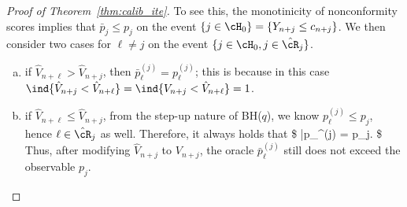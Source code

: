 \begin{proof}[Proof of Theorem~\ref{thm:calib_ite}]
To see this, the monotinicity of nonconformity scores
implies that $\bar{p}_j \leq   p_j$ on the event $\{j\in \cH_0\} =\{Y_{n+j} \leq c_{n+j}\}$.
We then consider two cases for $\ell\neq j$
on the event $\{j\in \cH_0, j\in \hat\cR_j\}$.
\begin{enumerate}[(a)]
\item if $\hat V_{n+\ell} > \hat{V}_{n+j}$, then $\bar{p} _\ell^{(j)} =   p_\ell^{(j)}$;
this is because in this case $\ind\{ \hat{V}_{n+j} < \hat{V}_{n+\ell} \} = \ind\{  {V}_{n+j} < \hat{V}_{n+\ell} \} = 1$.
\item if $\hat{V}_{n+\ell} \leq \hat{V}_{n+j}$, from the step-up nature
of BH($q$), we know $ {p}_{\ell}^{(j)} \leq  {p}_j$,
hence $\ell \in \hat\cR_j$ as well.
Therefore, it always holds that
\$
\bar{p}_{\ell}^{(j)} \leq {} \leq
{}=
  p_j.
\$
Thus, after modifying  $\hat{V}_{n+j}$ to $V_{n+j}$,
the oracle $\bar{p} _\ell^{(j)}$ still does not exceed the observable $ p_j$.
\end{enumerate}


\end{proof}
